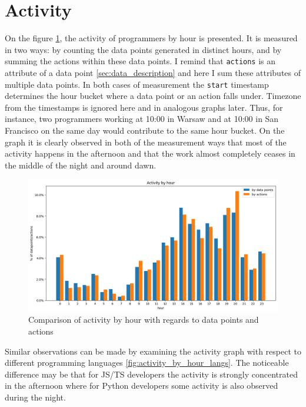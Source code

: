\section{Activity}

On the figure \ref{fig:activity_by_hour}, the activity of programmers by hour is presented. It is measured in two ways: by counting the data points generated in distinct hours, and by summing the actions within these data points. I remind that \texttt{actions} is an attribute of a data point \ref{sec:data_description} and here I sum these attributes of multiple data points. In both cases of measurement the \texttt{start} timestamp determines the hour bucket where a data point or an action falls under. Timezone from the timestamps is ignored here and in analogous graphs later. Thus, for instance, two programmers working at 10:00 in Warsaw and at 10:00 in San Francisco on the same day would contribute to the same hour bucket. On the graph it is clearly observed in both of the measurement ways that most of the activity happens in the afternoon and that the work almost completely ceases in the middle of the night and around dawn.

\begin{figure}[htbp]
  \centering
  \includegraphics[scale=0.5]{chapters/results/graphics/activity-by-hour.png}
  \caption{Comparison of activity by hour with regards to data points and actions}
  \label{fig:activity_by_hour}
\end{figure}

Similar observations can be made by examining the activity graph with respect to different programming languages \ref{fig:activity_by_hour_langs}. The noticeable difference may be that for JS/TS developers the activity is strongly concentrated in the afternoon where for Python developers some activity is also observed during the night.

